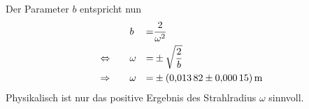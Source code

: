 %
%
Der Parameter $b$ entspricht nun
\begin{align*}
                  &&&&&      b &=&  \frac{2}{\omega^2} \\
  \Leftrightarrow &&&&& \omega &=& \pm \sqrt{\frac{2}{b}} \\
  \Rightarrow      &&&&& \omega &=& \pm \SI{ 0.01382 \pm 0.00015 }{m}\\
\end{align*}
Physikalisch ist nur das positive Ergebnis des Strahlradius $\omega$ sinnvoll.
%
\FloatBarrier

